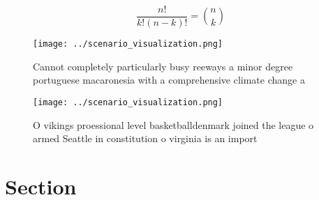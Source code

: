 \documentclass[a4paper]{article}
\begin{document}
\[ \frac{n!}{k!(n-k)!} = \binom{n}{k} \]

\begin{figure}
\centering
\texttt{[image: ../scenario\_visualization.png]}
\caption{Cannot completely particularly busy reeways a minor degree portuguese macaronesia with a comprehensive climate change a
}
\end{figure}
 
\begin{figure}
\centering
\texttt{[image: ../scenario\_visualization.png]}
\caption{O vikings proessional level basketballdenmark joined the league o armed Seattle in constitution o virginia is an import
}
\end{figure}
 
\section{Section}
\end{document}
